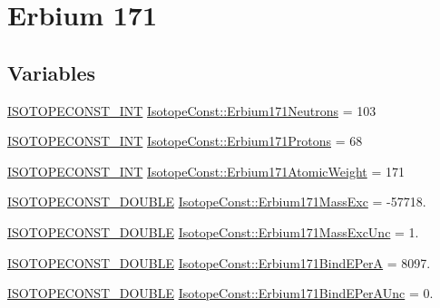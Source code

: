 \hypertarget{group___isotope_const-_erbium-_er171}{}\section{Erbium 171}
\label{group___isotope_const-_erbium-_er171}
\subsection*{Variables}
\begin{DoxyCompactItemize}
\item 
\mbox{\hyperlink{group___isotope_const-_macros_ga5f18360b3e99483a35c32d789e62621c}{I\+S\+O\+T\+O\+P\+E\+C\+O\+N\+S\+T\+\_\+\+I\+NT}} \mbox{\hyperlink{group___isotope_const-_erbium-_er171_gab6f7e2bc2565c40798d2b0d00c39ed62}{Isotope\+Const\+::\+Erbium171\+Neutrons}} = 103
\item 
\mbox{\hyperlink{group___isotope_const-_macros_ga5f18360b3e99483a35c32d789e62621c}{I\+S\+O\+T\+O\+P\+E\+C\+O\+N\+S\+T\+\_\+\+I\+NT}} \mbox{\hyperlink{group___isotope_const-_erbium-_er171_ga3f9defc54c621e8f279dd72a15ee2344}{Isotope\+Const\+::\+Erbium171\+Protons}} = 68
\item 
\mbox{\hyperlink{group___isotope_const-_macros_ga5f18360b3e99483a35c32d789e62621c}{I\+S\+O\+T\+O\+P\+E\+C\+O\+N\+S\+T\+\_\+\+I\+NT}} \mbox{\hyperlink{group___isotope_const-_erbium-_er171_ga37a0f030edaa848f0267e7bf0e2ab554}{Isotope\+Const\+::\+Erbium171\+Atomic\+Weight}} = 171
\item 
\mbox{\hyperlink{group___isotope_const-_macros_ga8f45a7272ce02c0b4c65c44636ed719a}{I\+S\+O\+T\+O\+P\+E\+C\+O\+N\+S\+T\+\_\+\+D\+O\+U\+B\+LE}} \mbox{\hyperlink{group___isotope_const-_erbium-_er171_ga15c1ae3d94e620dbba1d8ddfc9530046}{Isotope\+Const\+::\+Erbium171\+Mass\+Exc}} = -\/57718.
\item 
\mbox{\hyperlink{group___isotope_const-_macros_ga8f45a7272ce02c0b4c65c44636ed719a}{I\+S\+O\+T\+O\+P\+E\+C\+O\+N\+S\+T\+\_\+\+D\+O\+U\+B\+LE}} \mbox{\hyperlink{group___isotope_const-_erbium-_er171_ga2f527171183fbc996ac481a6bee5c88f}{Isotope\+Const\+::\+Erbium171\+Mass\+Exc\+Unc}} = 1.
\item 
\mbox{\hyperlink{group___isotope_const-_macros_ga8f45a7272ce02c0b4c65c44636ed719a}{I\+S\+O\+T\+O\+P\+E\+C\+O\+N\+S\+T\+\_\+\+D\+O\+U\+B\+LE}} \mbox{\hyperlink{group___isotope_const-_erbium-_er171_ga842c6dde3ba4c5fee23df099a1e6ff99}{Isotope\+Const\+::\+Erbium171\+Bind\+E\+PerA}} = 8097.
\item 
\mbox{\hyperlink{group___isotope_const-_macros_ga8f45a7272ce02c0b4c65c44636ed719a}{I\+S\+O\+T\+O\+P\+E\+C\+O\+N\+S\+T\+\_\+\+D\+O\+U\+B\+LE}} \mbox{\hyperlink{group___isotope_const-_erbium-_er171_ga462e45c0f5222aec4da5e636abcb345c}{Isotope\+Const\+::\+Erbium171\+Bind\+E\+Per\+A\+Unc}} = 0.

\end{DoxyCompactItemize}

